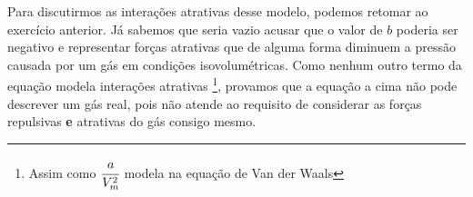 \begin{rsl}
    Para discutirmos as interações atrativas desse modelo, podemos retomar ao
    exercício anterior. Já sabemos que seria vazio acusar que o valor de $b$
    poderia ser negativo e representar forças atrativas que de alguma forma
    diminuem a pressão causada por um gás em condições isovolumétricas. Como
    nenhum outro termo da equação modela interações atrativas \footnote{Assim
    como \( \cfrac{a}{V_m^2} \) modela na
    equação de Van der Waals}, provamos que a
    equação a cima não pode descrever um gás real, pois não atende ao requisito
    de considerar as forças repulsivas \textbf{e} atrativas do gás
    consigo mesmo.   
\end{rsl}

